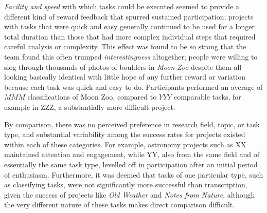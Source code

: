 \documentclass{sigchi}
\begin{document}
\emph{Facility and speed} with which tasks could be executed seemed to provide a different kind of reward feedback that spurred sustained participation; projects with tasks that were quick and easy generally continued to be used for a longer total duration than those that had more complex individual steps that required careful analysis or complexity.  This effect was found to be so strong that the team found this often trumped \emph{interestingness} altogether; people were willing to slog through thousands of photos of boulders in \emph{Moon Zoo} despite them all looking basically identical with little hope of any further reward or variation because each task was quick and easy to do.  Participants performed an average of $MMM$ classifications of Moon Zoo, compared to $YYY$ comparable tasks, for example in ZZZ, a substantially more difficult project.


By comparison, there was no perceived preference in research field, topic, or task type, and substantial variability among the success rates for projects existed within each of these categories.  For example, astronomy projects such as XX maintained attention and engagement, while YY, also from the same field and of essentially the same task type, levelled off in participation after an initial period of enthusiasm.   Furthermore, it was deemed that tasks of one particular type, such as classifying tasks, were not significantly more successful than transcription, given the success of projects like \emph{Old Weather} and \emph{Notes from Nature}, although the very different nature of these tasks makes direct comparison difficult.

\end{document}
